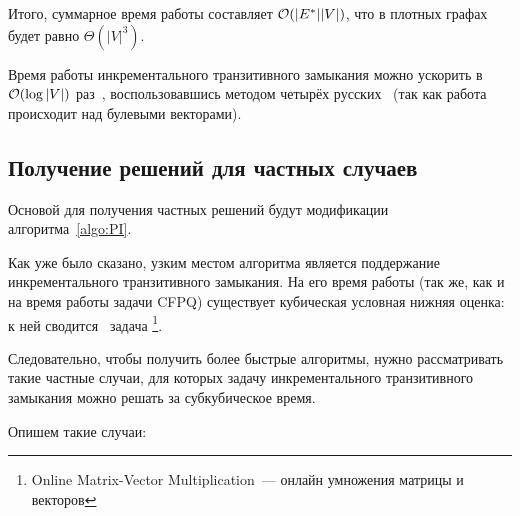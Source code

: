 Итого, суммарное время работы составляет $\mathcal{O}(|E^{*}||V|)$, что в плотных графах будет равно $\Theta(|V|^3)$. 

\begin{note}
  Время работы инкрементального транзитивного замыкания можно ускорить в $\mathcal{O}(\log |V|)$ раз~\cite{Shemetova21}, воспользовавшись методом четырёх русских~\cite{Arlazarov70} (так как работа происходит над булевыми векторами).
\end{note}

\subsection{Получение решений для частных случаев}

Основой для получения частных решений будут модификации алгоритма~\ref{algo:PI}.

Как уже было сказано, узким местом алгоритма является поддержание инкрементального транзитивного замыкания. На его время работы (так же, как и на время работы задачи CFPQ) существует кубическая условная нижняя оценка: к ней сводится~\cite{Henzinger15} задача \footnote{Online Matrix-Vector Multiplication~--- онлайн умножения матрицы и векторов}. 

Следовательно, чтобы получить более быстрые алгоритмы, нужно рассматривать такие частные случаи, для которых задачу инкрементального транзитивного замыкания можно решать за субкубическое время.

Опишем такие случаи:

